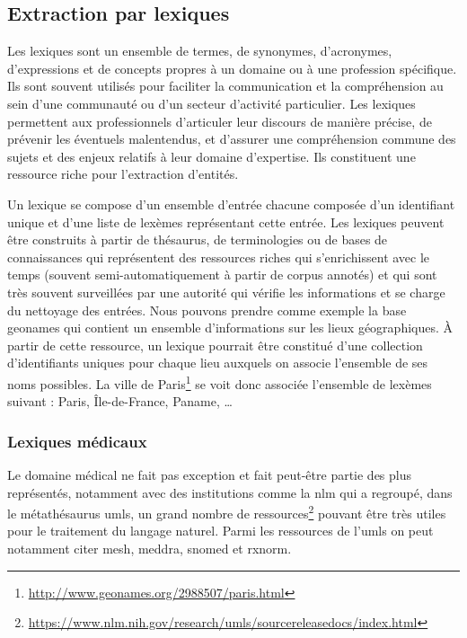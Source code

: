 \subsection{Extraction par lexiques}
\label{sec:ie:lexicon}

Les lexiques sont un ensemble de termes, de synonymes, d'acronymes, d'expressions et de concepts propres à un domaine ou à une profession spécifique.
Ils sont souvent utilisés pour faciliter la communication et la compréhension au sein d'une communauté ou d'un secteur d'activité particulier.
Les lexiques permettent aux professionnels d'articuler leur discours de manière précise, de prévenir les éventuels malentendus, et d'assurer une compréhension commune des sujets et des enjeux relatifs à leur domaine d'expertise.
Ils constituent une ressource riche pour l'extraction d'entités.

Un lexique se compose d'un ensemble d'entrée chacune composée d'un identifiant unique et d'une liste de lexèmes représentant cette entrée.
Les lexiques peuvent être construits à partir de thésaurus, de terminologies ou de bases de connaissances qui représentent des ressources riches qui s'enrichissent avec le temps (souvent semi-automatiquement à partir de corpus annotés) et qui sont très souvent surveillées par une autorité qui vérifie les informations et se charge du nettoyage des entrées.
Nous pouvons prendre comme exemple la base \gls{geonames} qui contient un ensemble d'informations sur les lieux géographiques.
À partir de cette ressource, un lexique pourrait être constitué d'une collection d'identifiants uniques pour chaque lieu auxquels on associe l'ensemble de ses noms possibles.
La ville de Paris\footnote{\url{http://www.geonames.org/2988507/paris.html}} se voit donc associée l'ensemble de lexèmes suivant : Paris, Île-de-France, Paname, \dots

\subsubsection{Lexiques médicaux}

Le domaine médical ne fait pas exception et fait peut-être partie des plus représentés, notamment avec des institutions comme la \gls{nlm} qui a regroupé, dans le métathésaurus \gls{umls}, un grand nombre de ressources\footnote{\url{https://www.nlm.nih.gov/research/umls/sourcereleasedocs/index.html}} pouvant être très utiles pour le traitement du langage naturel.
Parmi les ressources de l'\gls{umls} on peut notamment citer \gls{mesh}, \gls{meddra}, \gls{snomed} et \gls{rxnorm}.

